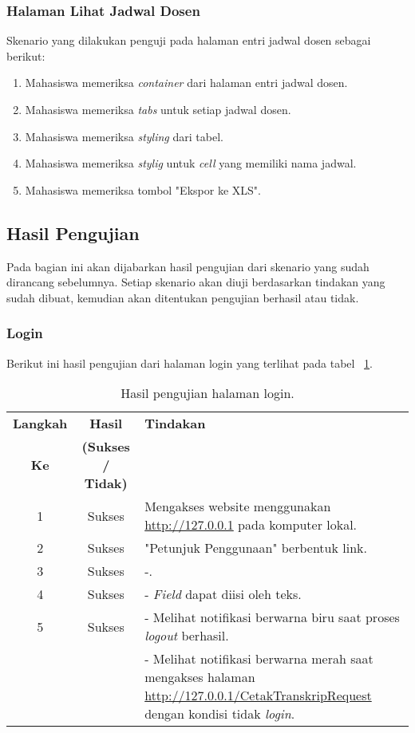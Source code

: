 \subsubsection{Halaman Lihat Jadwal Dosen}
Skenario yang dilakukan penguji pada halaman entri jadwal dosen sebagai berikut:
\begin{enumerate}
	\item Mahasiswa memeriksa \textit{container} dari halaman entri jadwal dosen.
	\item Mahasiswa memeriksa \textit{tabs} untuk setiap jadwal dosen.
	\item Mahasiswa memeriksa \textit{styling} dari tabel.	
	\item Mahasiswa memeriksa \textit{stylig} untuk \textit{cell} yang memiliki nama jadwal.
	\item Mahasiswa memeriksa tombol "Ekspor ke XLS".
\end{enumerate}

\subsection{Hasil Pengujian}
Pada bagian ini akan dijabarkan hasil pengujian dari skenario yang sudah dirancang sebelumnya. Setiap skenario akan diuji berdasarkan tindakan yang sudah dibuat, kemudian akan ditentukan pengujian berhasil atau tidak.
\subsubsection{Login}
Berikut ini hasil pengujian dari halaman login yang terlihat pada tabel ~\ref{hasil:Login}.
\begin{table}[H]
	\centering 
	\caption{Hasil pengujian halaman login.}
	\label{hasil:Login}
	\begin{tabular}{|c|c|p{}|}
		\toprule
		\textbf{Langkah} & \textbf{Hasil} & \textbf{Tindakan}\\
		\textbf{Ke} & \textbf{(Sukses / Tidak)} & \\		
		\midrule
		1 & Sukses & Mengakses website menggunakan \url{http://127.0.0.1} pada komputer lokal.\\
		\hline
		2 & Sukses & "Petunjuk Penggunaan" berbentuk link.\\
		\hline
		3 & Sukses & -.\\
		\hline
		4 & Sukses & - \textit{Field} dapat diisi oleh teks.\\									
		\hline
		5 & Sukses & - Melihat notifikasi berwarna biru saat proses \textit{logout} berhasil.\\
		&& - Melihat notifikasi berwarna merah saat mengakses halaman \url{http://127.0.0.1/CetakTranskripRequest} dengan kondisi tidak \textit{login}.\\
		\bottomrule		
	\end{tabular} 
\end{table}

